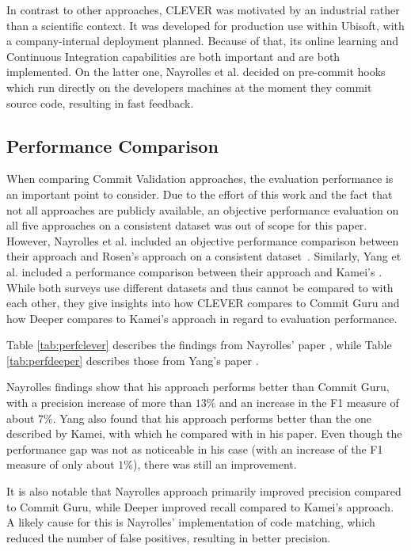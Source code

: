 In contrast to other approaches, CLEVER was motivated by an industrial rather than a scientific context. It was developed for production use within Ubisoft, with a company-internal deployment planned. Because of that, its online learning and Continuous Integration capabilities are both important and are both implemented. On the latter one, Nayrolles et al. decided on pre-commit hooks which run directly on the developers machines at the moment they commit source code, resulting in fast feedback.

\subsection{Performance Comparison}
\label{sec:performance}

When comparing Commit Validation approaches, the evaluation performance is an important point to consider. Due to the effort of this work and the fact that not all approaches are publicly available, an objective performance evaluation on all five approaches on a consistent dataset was out of scope for this paper. However, Nayrolles et al. included an objective performance comparison between their approach and Rosen's approach on a consistent dataset~\cite{Nayrolles2018}. 
Similarly, %
Yang et al. included a performance comparison between their approach and Kamei's \cite{Yang2015}. While both surveys use different datasets and thus cannot be compared to with each other, they give insights into how CLEVER compares to Commit Guru and how Deeper compares to Kamei's approach in regard to evaluation performance.

Table \ref{tab:perfclever} describes the findings from Nayrolles' paper \cite{Nayrolles2018}, while Table \ref{tab:perfdeeper} describes those from Yang's paper \cite{Yang2015}.

Nayrolles findings show that his approach performs better than Commit Guru, with a precision increase of more than $13\%$ and an increase in the F1 measure of about $7\%$. Yang also found that his approach performs better than the one described by Kamei, with which he compared with in his paper. Even though the performance gap was not as noticeable in his case (with an increase of the F1 measure of only about $1\%$), there was still an improvement. 

It is also notable that Nayrolles approach primarily improved precision compared to Commit Guru, while Deeper improved recall compared to Kamei's approach. 
A likely cause for this is Nayrolles' implementation of code matching, which reduced the number of false positives, resulting in better precision.

